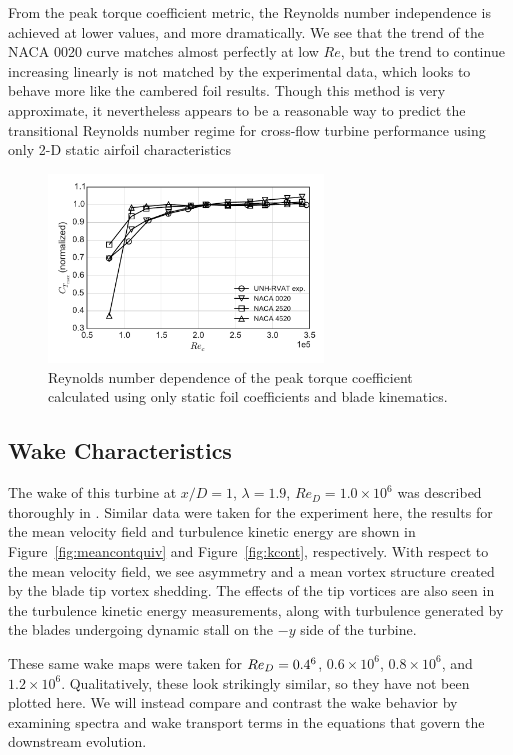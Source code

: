 \documentclass[energies,article,accept,moreauthors,pdftex,12pt,a4paper]{mdpi}
\begin{document}
From the peak torque coefficient metric, the Reynolds number independence is
achieved at lower values, and more dramatically. We see that the trend of the
NACA 0020 curve matches almost perfectly at low $Re$, but the trend to continue
increasing linearly is not matched by the experimental data, which looks to
behave more like the cambered foil results. Though this method is very
approximate, it nevertheless appears to be a reasonable way to predict the
transitional Reynolds number regime for cross-flow turbine performance using
only 2-D static airfoil characteristics

\begin{figure}[ht!]
\centering
\includegraphics[width=0.65\textwidth]{figures/cft_re_dep_foils}
\caption{Reynolds number dependence of the peak torque coefficient calculated using 
only static foil coefficients and blade kinematics.}
\label{fig:foils-C_T-Re-dep}
\end{figure}


\subsection{Wake Characteristics}

The wake of this turbine at $x/D=1$, $\lambda=1.9$, $Re_D = 1.0 \times 10^6$ was
described thoroughly in \cite{Bachant2015-JoT}. Similar data were taken for the
experiment here, the results for the mean velocity field and turbulence kinetic
energy are shown in Figure~\ref{fig:meancontquiv} and Figure~\ref{fig:kcont},
respectively. With respect to the mean velocity field, we see asymmetry and a
mean vortex structure created by the blade tip vortex shedding. The effects of
the tip vortices are also seen in the turbulence kinetic energy measurements,
along with turbulence generated by the blades undergoing dynamic stall on the
$-y$ side of the turbine.

These same wake maps were taken for $Re_D = 0.4 \time 10^6$, $0.6 \times 10^6$,
$0.8 \times 10^6$, and $1.2 \times 10^6$. Qualitatively, these look strikingly
similar, so they have not been plotted here. We will instead compare and
contrast the wake behavior by examining spectra and wake transport terms in the
equations that govern the downstream evolution.
\end{document}
